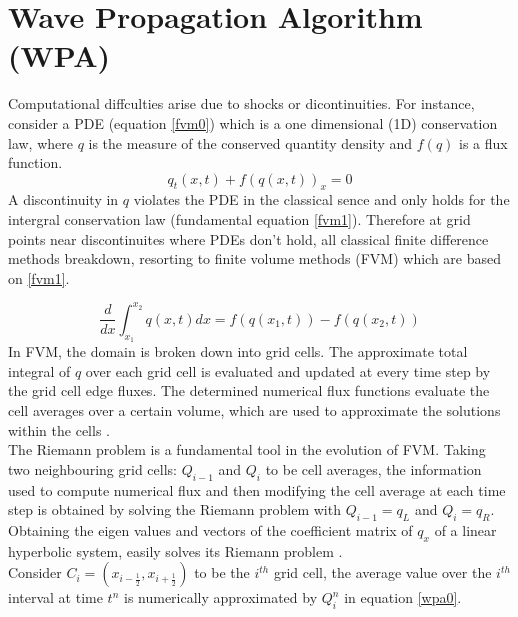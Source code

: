 \documentclass[12pt,a4paper]{article}
\begin{document}
	 

	\section{Wave Propagation Algorithm (WPA)}
    
    Computational diffculties arise  due to shocks or dicontinuities. For instance, consider a PDE (equation \eqref{fvm0}) which is a one dimensional (1D) conservation law,  where $q$ is the measure of the conserved quantity density and $f(q)$ is a flux function.
    \begin{equation}
    	q_{t}(x,t) + f(q(x,t))_{x} = 0
    	\label{fvm0}
    \end{equation}
     A discontinuity in $q$ violates the PDE in the classical sence and only holds for the intergral conservation law (fundamental equation \eqref{fvm1}). Therefore at grid points near discontinuites where PDEs don't hold, all classical finite difference methods breakdown, resorting to finite volume methods (FVM) which are based on \eqref{fvm1}. 
    
    \begin{equation}
    	\frac{d}{dx} \int_{x_{1}}^{x_{2}} q(x,t)dx = f(q(x_{1},t)) -  f(q(x_{2},t))
    	\label{fvm1}
    \end{equation}
	In FVM, the domain is broken down into grid cells.  The approximate  total integral of $q$ over each grid cell is evaluated and updated at every time step by the grid cell edge fluxes. The determined numerical flux functions evaluate the  cell averages over a certain volume, which are used to approximate the solutions within the cells \citep{leveque2002finite}.\\

	\noindent The Riemann problem is a fundamental tool in the evolution of FVM. Taking two neighbouring grid cells: $Q_{i-1}$ and $Q_{i}$ to be cell averages, the information used to compute numerical flux and then modifying the cell average at each time step is obtained by solving the Riemann problem with  $Q_{i-1} = q_{L}$   and  $Q_{i} = q_{R}$. Obtaining the eigen values and vectors of the coefficient matrix of $q_{x}$ of a linear hyperbolic system, easily solves its Riemann problem \citep{leveque2002finite}. \\
    
    \noindent	Consider $C_{i} = (x_{i-\frac{1}{2}},x_{i+\frac{1}{2}})$ to be the $i^{th}$ grid cell, the average value over the $i^{th}$ interval at time $t^{n}$ is numerically approximated by $Q_{i}^{n}$ in equation \eqref{wpa0}.
    
\end{document}
